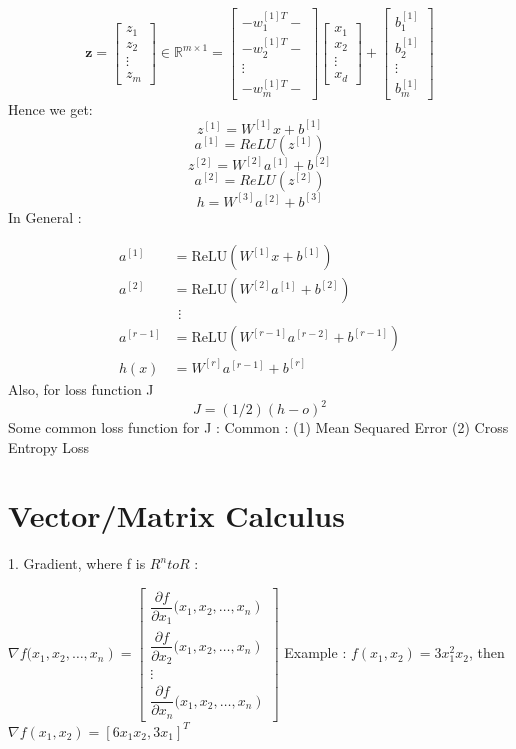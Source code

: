 \documentclass{article}
\begin{document}
\[
\mathbf{z} = \begin{bmatrix}
z_1 \\
z_2 \\
\vdots \\
z_m
\end{bmatrix} \in \mathbb{R}^{m \times 1} =
\begin{bmatrix}
-w^{[1]T}_1- \\
-w^{[1]T}_2- \\
\vdots \\
-w^{[1]T}_m-
\end{bmatrix}
\begin{bmatrix}
x_1 \\
x_2 \\
\vdots \\
x_d
\end{bmatrix}
+
\begin{bmatrix}
b^{[1]}_1 \\
b^{[1]}_2 \\
\vdots \\
b^{[1]}_m
\end{bmatrix}
\]
Hence we get: 
\[ z^{[1]}=W^{[1]}x+b^{[1]} \]
\[ a^{[1]} = ReLU(z^{[1]}) \]
\[ z^{[2]}=W^{[2]}a^{[1]}+b^{[2]} \]
\[ a^{[2]} = ReLU(z^{[2]}) \]
\[ h=W^{[3]}a^{[2]}+b^{[3]} \]
In General : 

\[
\begin{aligned}
a^{[1]} &= \text{ReLU}(W^{[1]}x + b^{[1]}) \\
a^{[2]} &= \text{ReLU}(W^{[2]}a^{[1]} + b^{[2]}) \\
&\ \, \vdots \\
a^{[r-1]} &= \text{ReLU}(W^{[r-1]}a^{[r-2]} + b^{[r-1]}) \\
h(x) &= W^{[r]}a^{[r-1]} + b^{[r]}
\end{aligned}
\]
Also, for loss function J
\[J = (1/2)(h-o)^2\]
Some common loss function for J : Common : (1) Mean Sequared Error (2) Cross Entropy Loss 


\section{Vector/Matrix Calculus}
1. Gradient, where f is \(R^n to R\) : \newline

 \( \nabla f(\left.x_{1}, x_{2}, \ldots, x_{n}\right)=\left[\begin{array}{c}
\dfrac{\partial f}{\partial x_1}(\left.x_{1}, x_{2}, \ldots, x_{n}\right)\\
\dfrac{\partial f}{\partial x_2}(\left.x_{1}, x_{2}, \ldots, x_{n}\right) \\
\vdots \\
\dfrac{\partial f}{\partial x_n}(\left.x_{1}, x_{2}, \ldots, x_{n}\right) 
\end{array}\right]\) \newline
Example : \(f(x_1,x_2) = 3x_1^2x_2\), then \( \nabla f(x_1,x_2) = [6x_1x_2,3x_1]^T \) \newline
\end{document}
